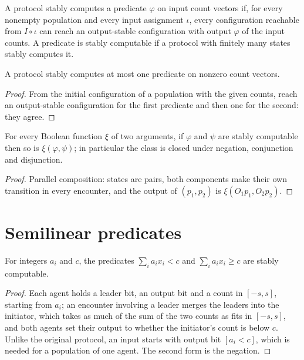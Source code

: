 \begin{definition}\label{def:stable}
\leanok{}
A protocol stably computes a predicate $\varphi$ on input count vectors if, for every nonempty
population and every input assignment $\iota$, every configuration reachable from $I \circ \iota$
can reach an output-stable configuration with output $\varphi$ of the input counts. A predicate is
stably computable if a protocol with finitely many states stably computes it.
\end{definition}

\begin{lemma}[Uniqueness]\label{lem:stable-unique}
\leanok{}
A protocol stably computes at most one predicate on nonzero count vectors.
\end{lemma}
\begin{proof}\leanok
From the initial configuration of a population with the given counts, reach an output-stable
configuration for the first predicate and then one for the second: they agree.
\end{proof}

\begin{theorem}\label{thm:boolean}
\leanok{}
For every Boolean function $\xi$ of two arguments, if $\varphi$ and $\psi$ are stably computable
then so is $\xi(\varphi, \psi)$; in particular the class is closed under negation, conjunction and
disjunction.
\end{theorem}
\begin{proof}\leanok
Parallel composition: states are pairs, both components make their own transition in every
encounter, and the output of $(p_1, p_2)$ is $\xi(O_1 p_1, O_2 p_2)$.
\end{proof}

\section{Semilinear predicates}
\begin{theorem}\label{thm:threshold}
\leanok{}
For integers $a_i$ and $c$, the predicates $\sum_i a_i x_i < c$ and $\sum_i a_i x_i \ge c$ are stably
computable.
\end{theorem}
\begin{proof}\leanok
Each agent holds a leader bit, an output bit and a count in $[-s, s]$, starting from $a_i$; an
encounter involving a leader merges the leaders into the initiator, which takes as much of the sum
of the two counts as fits in $[-s, s]$, and both agents set their output to whether the
initiator's count is below $c$. Unlike the original protocol, an input starts with output bit
$[a_i < c]$, which is needed for a population of one agent. The second form is the negation.
\end{proof}

